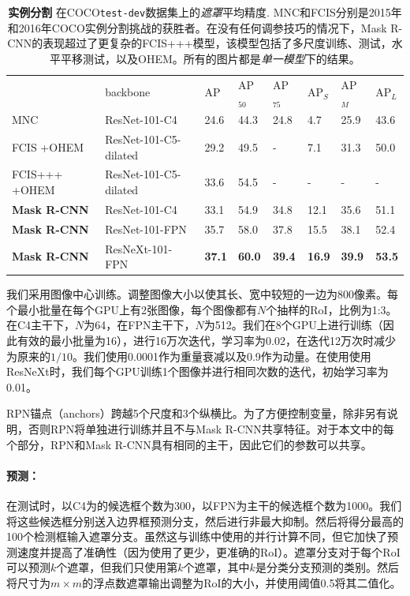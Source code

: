 \begin{table}[t]
\begin{tabular}{l|l|x{22}x{22}x{22}|x{22}x{22}x{22}}
 & backbone &  AP &  AP$_{50}$ & AP$_{75}$ & AP$_S$ &  AP$_M$ &  AP$_L$\\
\shline
 MNC  & ResNet-101-C4
  & 24.6 & 44.3 & 24.8 & 4.7 & 25.9 & 43.6\\
 FCIS  +OHEM & ResNet-101-C5-dilated
  & 29.2 & 49.5 & - & 7.1 & 31.3 & 50.0\\
 FCIS+++  +OHEM & ResNet-101-C5-dilated
  & 33.6 & 54.5 & - & - & - & -\\
\hline
 \textbf{Mask R-CNN} & ResNet-101-C4
  & 33.1 & 54.9 & 34.8 & 12.1 & 35.6 & 51.1 \\
 \textbf{Mask R-CNN} & ResNet-101-FPN
  & 35.7 & 58.0 & 37.8 & 15.5 & 38.1 & 52.4\\
 \textbf{Mask R-CNN} & ResNeXt-101-FPN
  & \textbf{37.1} & \textbf{60.0} & \textbf{39.4} & \textbf{16.9} & \textbf{39.9} & \textbf{53.5}
\end{tabular}
\caption{\textbf{实例分割} 在COCO\texttt{test-dev}数据集上的\emph{遮罩}平均精度. MNC和FCIS分别是2015年和2016年COCO实例分割挑战的获胜者。在没有任何调参技巧的情况下，Mask R-CNN的表现超过了更复杂的FCIS+++模型，该模型包括了多尺度训练、测试，水平平移测试，以及OHEM。所有的图片都是\emph{单一模型}下的结果。}
\label{tab:final_mask}
\end{table}

我们采用图像中心训练。调整图像大小以使其长、宽中较短的一边为800像素。每个最小批量在每个GPU上有2张图像，每个图像都有$N$个抽样的RoI，比例为1:3。在C4主干下，$N$为64，在FPN主干下，$N$为512。我们在8个GPU上进行训练（因此有效的最小批量为16），进行16万次迭代，学习率为0.02，在迭代12万次时减少为原来的$1/10$。我们使用0.0001作为重量衰减以及0.9作为动量。在使用使用ResNeXt时，我们每个GPU训练1个图像并进行相同次数的迭代，初始学习率为0.01。

RPN锚点（anchors）跨越5个尺度和3个纵横比。为了方便控制变量，除非另有说明，否则RPN将单独进行训练并且不与Mask R-CNN共享特征。对于本文中的每个部分，RPN和Mask R-CNN具有相同的主干，因此它们的参数可以共享。

\paragraph{预测：} 在测试时，以C4为的候选框个数为300，以FPN为主干的候选框个数为1000。我们将这些候选框分别送入边界框预测分支，然后进行非最大抑制。然后将得分最高的100个检测框输入遮罩分支。虽然这与训练中使用的并行计算不同，但它加快了预测速度并提高了准确性（因为使用了更少，更准确的RoI）。遮罩分支对于每个RoI可以预测$k$个遮罩，但我们只使用第$k$个遮罩，其中$k$是分类分支预测的类别。然后将尺寸为$m\times m$的浮点数遮罩输出调整为RoI的大小，并使用阈值0.5将其二值化。

